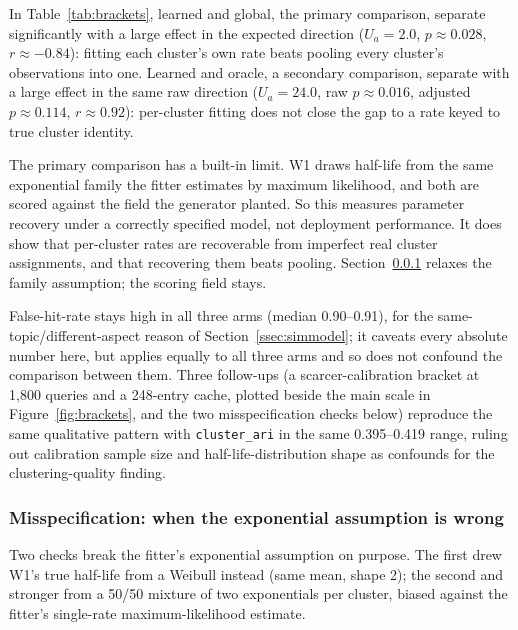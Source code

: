 \documentclass[10pt]{article}
\begin{document}
In Table~\ref{tab:brackets}, learned and global, the primary comparison, separate
significantly with a large effect in
the expected direction ($U_a = 2.0$, $p \approx 0.028$, $r \approx -0.84$): fitting each
cluster's own rate beats pooling every cluster's observations into one. Learned and
oracle, a secondary comparison, separate with a large effect in the same raw direction
($U_a = 24.0$, raw $p \approx 0.016$, adjusted $p \approx 0.114$, $r \approx 0.92$): per-cluster
fitting does not close the gap to a rate keyed to true cluster identity.

The primary comparison has a built-in limit. W1 draws half-life from the same exponential
family the fitter estimates by maximum likelihood, and both are scored against the field the
generator planted. So this measures parameter recovery under a correctly specified model,
not deployment performance. It does show that per-cluster rates are recoverable from
imperfect real cluster assignments, and that recovering them beats pooling.
Section~\ref{ssec:misspec} relaxes the family assumption; the scoring field stays.

False-hit-rate stays high in all three arms (median 0.90--0.91), for the
same-topic/different-aspect reason of Section~\ref{ssec:simmodel}; it caveats every absolute
number here, but applies equally to all three arms and so does not confound the comparison
between them. Three follow-ups (a scarcer-calibration bracket at 1{,}800 queries and a
248-entry cache, plotted beside the main scale in Figure~\ref{fig:brackets}, and the two
misspecification checks below) reproduce the same qualitative
pattern with \texttt{cluster\_ari} in the same 0.395--0.419 range, ruling out calibration
sample size and half-life-distribution shape as confounds for the clustering-quality finding.

\subsubsection{Misspecification: when the exponential assumption is wrong}
\label{ssec:misspec}

Two checks break the fitter's exponential assumption on purpose. The first drew W1's true
half-life from a Weibull instead (same mean, shape 2); the second and stronger from a 50/50
mixture of two exponentials per cluster, biased against the fitter's single-rate
maximum-likelihood estimate.
\end{document}
